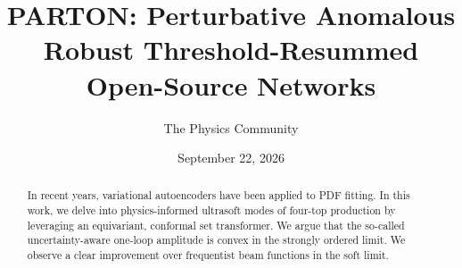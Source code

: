 \documentclass[11pt]{article}
\title{PARTON: Perturbative Anomalous Robust Threshold-Resummed Open-Source Networks}
\author{The Physics Community}
\date{September 22, 2026}
\begin{document}
\maketitle
\begin{abstract}
In recent years, variational autoencoders have been applied to PDF
fitting. In this work, we delve into physics-informed ultrasoft modes of
four-top production by leveraging an equivariant, conformal set
transformer. We argue that the so-called uncertainty-aware one-loop
amplitude is convex in the strongly ordered limit. We observe a clear
improvement over frequentist beam functions in the soft limit.
\end{abstract}
\tableofcontents




\nocite{*}


\end{document}
